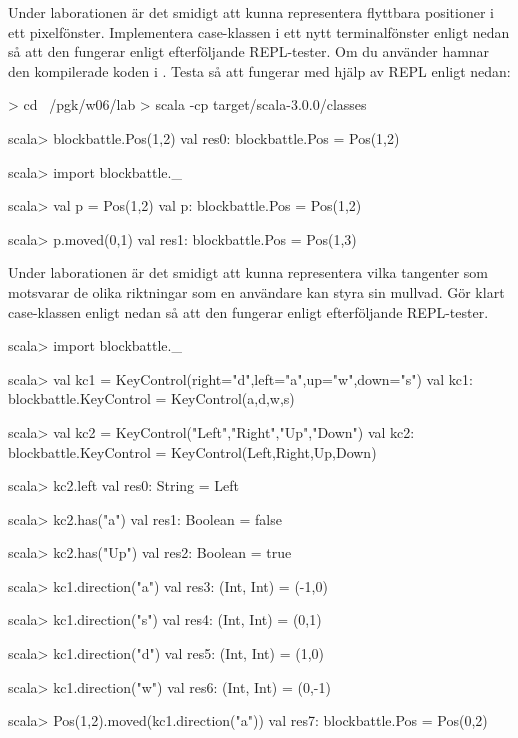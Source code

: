 \Subtask Under laborationen är det smidigt att kunna representera flyttbara positioner i ett pixelfönster. Implementera case-klassen  i ett nytt terminalfönster enligt nedan så att den fungerar enligt efterföljande REPL-tester.
Om du använder  hamnar den kompilerade koden i . Testa så att  fungerar med hjälp av REPL enligt nedan:
\begin{REPL}
> cd ~/pgk/w06/lab
> scala -cp target/scala-3.0.0/classes

scala> blockbattle.Pos(1,2)
val res0: blockbattle.Pos = Pos(1,2)

scala> import blockbattle._

scala> val p = Pos(1,2)
val p: blockbattle.Pos = Pos(1,2)

scala> p.moved(0,1)
val res1: blockbattle.Pos = Pos(1,3)
\end{REPL}

\Subtask Under laborationen är det smidigt att kunna representera vilka tangenter som motsvarar de olika riktningar som en användare kan styra sin mullvad. Gör klart case-klassen  enligt nedan så att den fungerar enligt efterföljande REPL-tester.
%
\begin{REPL}
scala> import blockbattle._

scala> val kc1 = KeyControl(right="d",left="a",up="w",down="s")
val kc1: blockbattle.KeyControl = KeyControl(a,d,w,s)

scala> val kc2 = KeyControl("Left","Right","Up","Down")
val kc2: blockbattle.KeyControl = KeyControl(Left,Right,Up,Down)

scala> kc2.left
val res0: String = Left

scala> kc2.has("a")
val res1: Boolean = false

scala> kc2.has("Up")
val res2: Boolean = true

scala> kc1.direction("a")
val res3: (Int, Int) = (-1,0)

scala> kc1.direction("s")
val res4: (Int, Int) = (0,1)

scala> kc1.direction("d")
val res5: (Int, Int) = (1,0)

scala> kc1.direction("w")
val res6: (Int, Int) = (0,-1)

scala> Pos(1,2).moved(kc1.direction("a"))
val res7: blockbattle.Pos = Pos(0,2)
\end{REPL}


